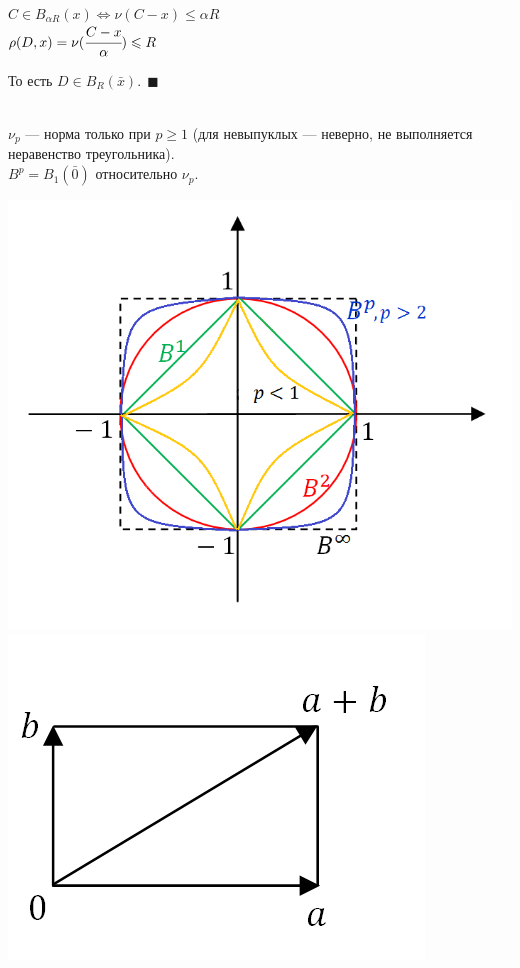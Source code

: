 \documentclass[12pt]{article}
\theoremstyle{definition}
\numberwithin{equation}{section}
\begin{document}
\begin{enumerate}
\begin{center}
$C \in B_{\alpha R}(x) \Leftrightarrow \nu(C-x) \leqslant \alpha R$\\
$\rho(D, x) = \nu(\cfrac{C-x}{\alpha}) \leqslant R$\end{center} То есть $D \in B_R(\bar x). ~~\blacksquare$
\end{enumerate}
~\\$\nu_p$ --- норма только при $p \geqslant 1$ (для невыпуклых --- неверно, не выполняется неравенство треугольника).\\
$B^p = B_1(\bar 0)$ относительно $\nu_p$.\begin{center}
\includegraphics[scale=0.7]{l4_11.png}
\includegraphics[scale=0.5]{l4_12.png}
\end{center}
\end{document}
